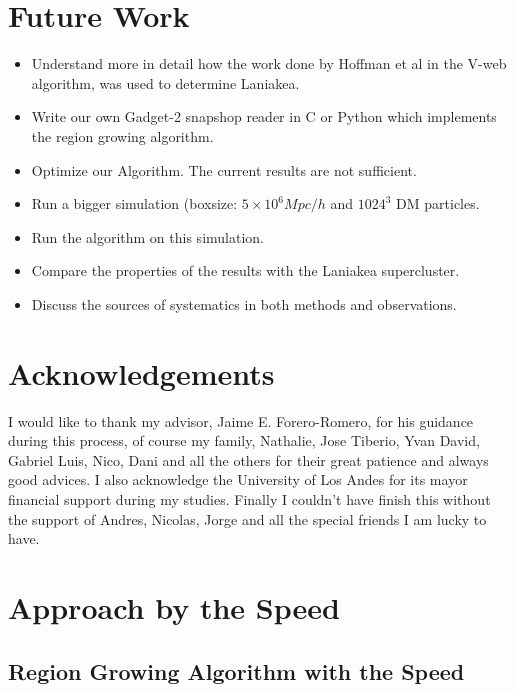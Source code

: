 \documentclass[12pt]{article}
\begin{document}
\section{Future Work}
\begin{itemize}
	\item Understand more in detail how the work done by Hoffman et al\cite{hoffman_kinematic_2012} in the V-web algorithm, was used to determine Laniakea.
    \item Write our own Gadget-2 snapshop reader in C or Python which implements the region growing algorithm.
    \item Optimize our Algorithm. The current results are not sufficient.
    \item Run a bigger simulation (boxsize: $5 \times 10^{6} Mpc/h$ and $1024^3$ DM particles.
    \item Run the algorithm on this simulation.
    \item Compare the properties of the results with the Laniakea supercluster.
    \item Discuss the sources of systematics in both methods and observations.
\end{itemize}

\section{Acknowledgements}

I would like to thank my advisor, Jaime E. Forero-Romero, for his guidance
 during this process, of course my family, Nathalie, Jose Tiberio, Yvan David,
  Gabriel Luis, Nico, Dani and all the others for their great patience and always good advices. I also acknowledge the University of Los Andes for its mayor financial support during my studies. Finally I couldn't have finish this without the support of Andres, Nicolas, Jorge and all the special friends I am lucky to have.






\appendix
\section{Approach by the Speed} \label{App:App_Speed}
\subsection{Region Growing Algorithm with the Speed}
\end{document}
